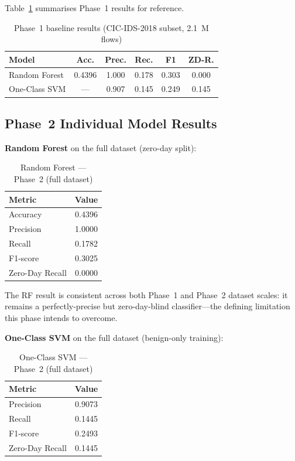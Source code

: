 \documentclass[10pt,conference]{IEEEtran}
\begin{document}
Table~\ref{tab:phase1recap} summarises Phase~1 results for reference.

\begin{table}[htbp]
\centering
\caption{Phase~1 baseline results (CIC-IDS-2018 subset, 2.1~M flows)}
\label{tab:phase1recap}
\begin{tabular}{lccccc}
\toprule
\textbf{Model} & \textbf{Acc.} & \textbf{Prec.} & \textbf{Rec.} & \textbf{F1} & \textbf{ZD-R.} \\
\midrule
Random Forest & 0.4396 & 1.000 & 0.178 & 0.303 & 0.000 \\
One-Class SVM & ---    & 0.907 & 0.145 & 0.249 & 0.145 \\
\bottomrule
\end{tabular}
\end{table}

\subsection{Phase~2 Individual Model Results}

\textbf{Random Forest} on the full dataset (zero-day split):

\begin{table}[htbp]
\centering
\caption{Random Forest — Phase~2 (full dataset)}
\label{tab:rf_p2}
\begin{tabular}{lc}
\toprule
\textbf{Metric} & \textbf{Value} \\
\midrule
Accuracy        & 0.4396 \\
Precision       & 1.0000 \\
Recall          & 0.1782 \\
F1-score        & 0.3025 \\
Zero-Day Recall & 0.0000 \\
\bottomrule
\end{tabular}
\end{table}

\noindent The RF result is consistent across both Phase~1 and Phase~2
dataset scales: it remains a perfectly-precise but zero-day-blind
classifier—the defining limitation this phase intends to overcome.

\textbf{One-Class SVM} on the full dataset (benign-only training):

\begin{table}[htbp]
\centering
\caption{One-Class SVM — Phase~2 (full dataset)}
\label{tab:ocsvm_p2}
\begin{tabular}{lc}
\toprule
\textbf{Metric} & \textbf{Value} \\
\midrule
Precision       & 0.9073 \\
Recall          & 0.1445 \\
F1-score        & 0.2493 \\
Zero-Day Recall & 0.1445 \\
\bottomrule
\end{tabular}
\end{table}
\end{document}
